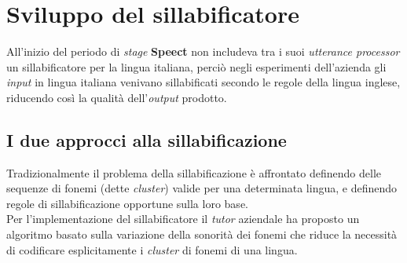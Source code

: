 \section{Sviluppo del sillabificatore}
\label{sec:progettazione}
All'inizio del periodo di \textit{stage} \textbf{Speect} non includeva tra i suoi \textit{utterance processor} un sillabificatore
per la lingua italiana, perciò negli esperimenti dell'azienda gli \textit{input} in lingua italiana venivano sillabificati secondo le regole
della lingua inglese, riducendo così la qualità dell'\textit{output} prodotto.
\subsection{I due approcci alla sillabificazione}
Tradizionalmente il problema della sillabificazione è affrontato definendo delle sequenze di fonemi (dette \textit{cluster}) valide per 
una determinata lingua, e definendo regole di sillabificazione opportune sulla loro base. \\ Per l'implementazione del sillabificatore
il \textit{tutor} aziendale ha proposto un algoritmo basato sulla variazione della sonorità dei fonemi che riduce la necessità di 
codificare esplicitamente i \textit{cluster} di fonemi di una lingua.
